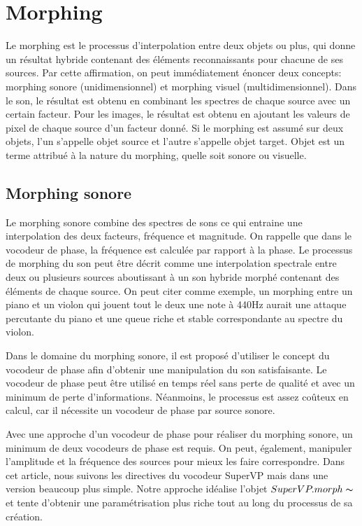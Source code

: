 \section{Morphing}

Le morphing est le processus d'interpolation entre deux objets ou plus, qui donne un résultat hybride contenant des éléments reconnaissants pour chacune de ses sources. Par cette affirmation, on peut immédiatement énoncer deux concepts: morphing sonore (unidimensionnel) et morphing visuel (multidimensionnel). Dans le son, le résultat est obtenu en combinant les spectres de chaque source avec un certain facteur. Pour les images, le résultat est obtenu en ajoutant les valeurs de pixel de chaque source d’un facteur donné. Si le morphing est assumé sur deux objets, l'un s'appelle objet source et l'autre s'appelle objet target. Objet est un terme attribué à la nature du morphing, quelle soit sonore ou visuelle.

    \subsection{Morphing sonore}
    
Le morphing sonore combine des spectres de sons ce qui entraine une interpolation des deux facteurs, fréquence et magnitude. On rappelle que dans le vocodeur de phase, la fréquence est calculée par rapport à la phase. Le processus de morphing du son peut être décrit comme une interpolation spectrale entre deux ou plusieurs sources aboutissant à un son hybride morphé contenant des éléments de chaque source. On peut citer comme exemple, un morphing entre un piano et un violon qui jouent tout le deux une note à 440Hz aurait une attaque percutante du piano et une queue riche et stable correspondante au spectre du violon.

Dans le domaine du morphing sonore, il est proposé d’utiliser le concept du vocodeur de phase afin d'obtenir une manipulation du son satisfaisante. Le vocodeur de phase peut être utilisé en temps réel sans perte de qualité et avec un minimum de perte d'informations. Néanmoins, le processus est assez coûteux en calcul, car il nécessite un vocodeur de phase par source sonore.

Avec une approche d'un vocodeur de phase pour réaliser du morphing sonore, un minimum de deux vocodeurs de phase est requis. On peut, également, manipuler l'amplitude et la fréquence des sources pour mieux les faire correspondre. Dans cet article, nous suivons les directives du vocodeur SuperVP mais dans une version beaucoup plus simple. Notre approche idéalise l'objet $SuperVP.morph \thicksim $ et tente d'obtenir une paramétrisation plus riche tout au long du processus de sa création.

